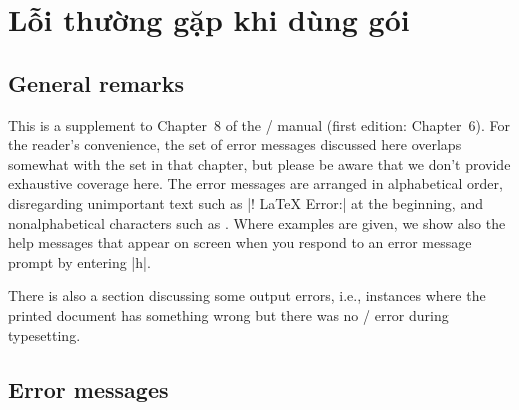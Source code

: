 \documentclass[11pt,leqno,titlepage,openany,oneside]{amsldoc}[1999/12/13]
\begin{document}
\chapter{Lỗi thường gặp khi dùng gói }

\section{General remarks}

This is a supplement to Chapter~8 of the \latex/ manual \cite{lamport} (first
edition: Chapter~6). For the reader's convenience, the set of error
messages discussed here overlaps somewhat with the set in that chapter,
but please be aware that we don't provide exhaustive coverage here.
The error messages are arranged in alphabetical order, disregarding
unimportant text such as |! LaTeX Error:| at the beginning, and
nonalphabetical characters such as \qc{\\}. Where examples are given, we
show also the help messages that appear on screen when you respond to an
error message prompt by entering |h|.

There is also a section discussing some output errors, i.e., instances
where the printed document has something wrong but there was no \latex/
error during typesetting.

\section{Error messages}

\end{document}
